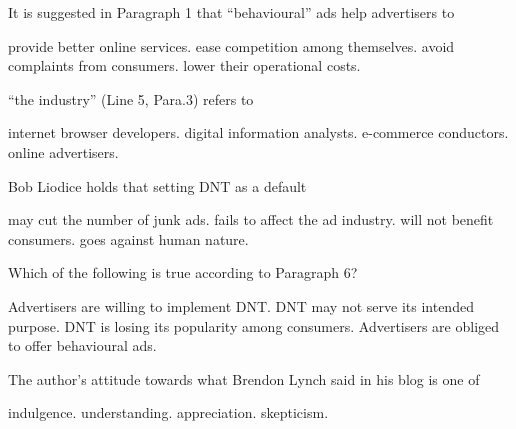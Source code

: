 \item It is suggested in Paragraph 1 that ``behavioural'' ads help advertisers to
\begin{tasks}
	\task provide better online services.
	\task ease competition among themselves.
	\task avoid complaints from consumers.
	\task lower their operational costs.
\end{tasks}
\item ``the industry'' (Line 5, Para.3) refers to
\begin{tasks}
	\task internet browser developers.
	\task digital information analysts.
	\task e-commerce conductors.
	\task online advertisers.
\end{tasks}
\item Bob Liodice holds that setting DNT as a default
\begin{tasks}
	\task may cut the number of junk ads.
	\task fails to affect the ad industry.
	\task will not benefit consumers.
	\task goes against human nature.
\end{tasks}
\item Which of the following is true according to Paragraph 6?
\begin{tasks}
	\task Advertisers are willing to implement DNT.
	\task DNT may not serve its intended purpose.
	\task DNT is losing its popularity among consumers.
	\task Advertisers are obliged to offer behavioural ads.
\end{tasks}
\item The author's attitude towards what Brendon Lynch said in his blog is one of
\begin{tasks}
	\task indulgence.
	\task understanding.
	\task appreciation.
	\task skepticism.
\end{tasks}